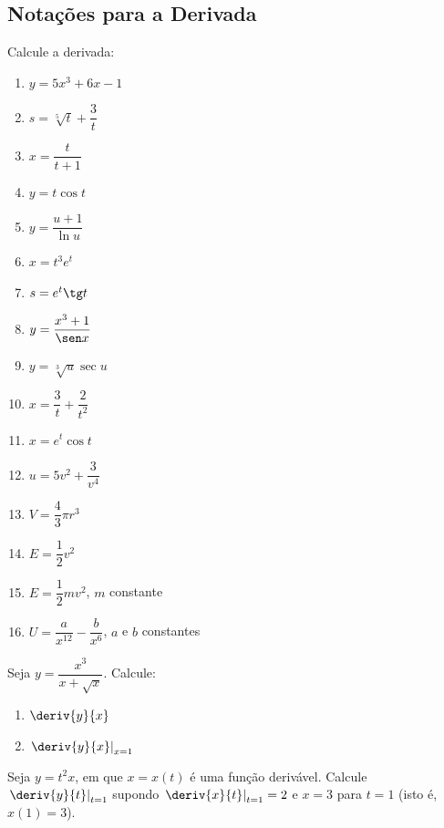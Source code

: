 \clearpage

\subsection{Notações para a Derivada}

\begin{exercicio}[1]
\label{ex:7.9.1}
Calcule a derivada:
\begin{enumerate}[label=\alph*)]
    \item $y = 5x^3 + 6x - 1$
    \item $s = \sqrt[5]{t} + \dfrac{3}{t}$
    \item $x = \dfrac{t}{t + 1}$
    \item $y = t \cos t$
    \item $y = \dfrac{u + 1}{\ln u}$
    \item $x = t^3 e^t$
    \item $s = e^t \tg t$
    \item $y = \dfrac{x^3 + 1}{\sen x}$
    \item $y = \sqrt[3]{u} \sec u$
    \item $x = \dfrac{3}{t} + \dfrac{2}{t^2}$
    \item $x = e^t \cos t$
    \item $u = 5v^2 + \dfrac{3}{v^4}$
    \item $V = \dfrac{4}{3}\pi r^3$
    \item $E = \dfrac{1}{2}v^2$
    \item $E = \dfrac{1}{2}mv^2$, $m$ constante
    \item $U = \dfrac{a}{x^{12}} - \dfrac{b}{x^6}$, $a$ e $b$ constantes
\end{enumerate}
\end{exercicio}

\begin{exercicio}[2]
\label{ex:7.9.2}
Seja $y = \dfrac{x^3}{x + \sqrt{x}}$. Calcule:
\begin{enumerate}[label=\alph*)]
    \item $\deriv{y}{x}$
    \item $\left.\deriv{y}{x}\right|_{x = 1}$
\end{enumerate}
\end{exercicio}

\begin{exercicio}[3]
\label{ex:7.9.3}
Seja $y = t^2 x$, em que $x = x(t)$ é uma função derivável. Calcule $\left.\deriv{y}{t}\right|_{t = 1}$ supondo $\left.\deriv{x}{t}\right|_{t = 1} = 2$ e $x = 3$ para $t = 1$ (isto é, $x(1) = 3$).
\end{exercicio}

